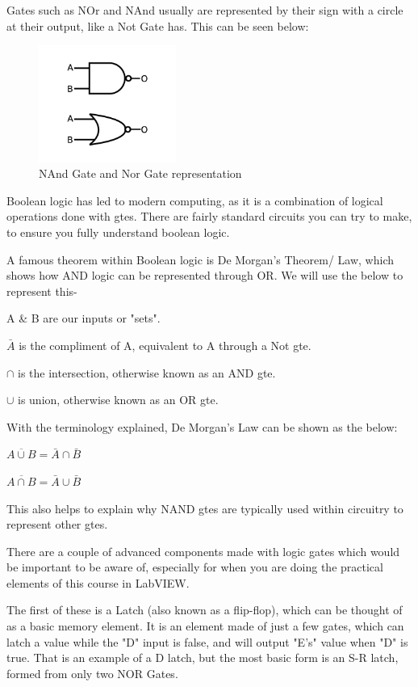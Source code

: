 \documentclass[a4paper,11pt]{report}
\begin{document}
Gates such as NOr and NAnd usually are represented by their sign with a circle at their output, like a Not Gate has. This can be seen below:

\begin{figure}[H]
\centering
\includegraphics[width=0.4\textwidth]{nandnor}
\caption{NAnd Gate and Nor Gate representation}
\end{figure}

Boolean logic has led to modern computing, as it is a combination of logical operations done with \gls{gte}s. There are fairly standard circuits you can try to make, to ensure you fully understand boolean logic.

A famous theorem within Boolean logic is De Morgan's Theorem/ Law, which shows how AND logic can be represented through OR. We will use the below to represent this-

A \& B are our inputs or "sets".

$\bar{A}$ is the compliment of A, equivalent to A through a Not \gls{gte}.

$\cap$ is the intersection, otherwise known as an AND \gls{gte}.

$\cup$ is union, otherwise known as an OR \gls{gte}.

With the terminology explained, De Morgan's Law can be shown as the below:

$\overline{A\cup B} = \bar{A}\cap\bar{B}$

$\overline{A\cap B} = \bar{A}\cup\bar{B}$

This also helps to explain why NAND \gls{gte}s are typically used within circuitry to represent other \gls{gte}s.

There are a couple of advanced components made with logic gates which would be important to be aware of, especially for when you are doing the practical elements of this course in LabVIEW.

The first of these is a Latch (also known as a flip-flop), which can be thought of as a basic memory element. It is an element made of just a few gates, which can latch a value while the "D" input is false, and will output "E's" value when "D" is true. That is an example of a D latch, but the most basic form is an S-R latch, formed from only two NOR Gates.
\end{document}
